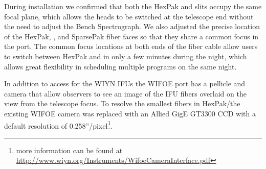 During installation we confirmed that both the HexPak and \GP slits
occupy the same focal plane, which allows the heads to be switched at
the telescope end without the need to adjust the Bench Spectrograph.
We also adjusted the precise location of the HexPak, \GP, and
SparsePak \citep{Bershady05} fiber faces so that they share a common
focus in the port. The common focus locations at both ends of the
fiber cable allow users to switch between HexPak and \GP in only a few
minutes during the night, which allows great flexibility in scheduling
multiple programs on the same night.

In addition to access for the WIYN IFUs the WIFOE port has a pellicle
and camera that allow observers to see an image of the IFU fibers
overlaid on the view from the telescope focus. To resolve the smallest
fibers in HexPak/\GP the existing WIFOE camera was replaced with an
Allied GigE GT3300 CCD with a default resolution of
0.258''/pixel\footnote{more information can be found at
  \url{http://www.wiyn.org/Instruments/WifoeCameraInterface.pdf}}.
